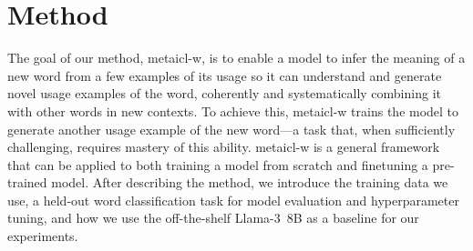 \documentclass{article}
\begin{document}

\section{Method}
The goal of our method, \ac{metaicl-w}, is to enable a model to infer the meaning of a new word from a few examples of its usage so it can understand and generate novel usage examples of the word, coherently and systematically combining it with other words in new contexts.
To achieve this, \ac{metaicl-w} trains the model to generate another usage example of the new word---a task that, when sufficiently challenging, requires mastery of this ability.
\ac{metaicl-w} is a general framework that can be applied to both training a model from scratch and finetuning a pre-trained model.
After describing the method, we introduce the training data we use, a held-out word classification task for model evaluation and hyperparameter tuning, and how we use the off-the-shelf \mbox{Llama-3 8B} as a baseline for our experiments.
\end{document}
